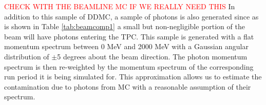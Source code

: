 \textcolor{red}{CHECK WITH THE BEAMLINE MC IF WE REALLY NEED THIS}
In addition to this sample of DDMC, a sample of photons is also generated since as is shown in Table \ref{tab:beamcomp1} a small but non-negligible portion of the beam will have photons entering the TPC. This sample is generated with a flat momentum spectrum between 0 MeV and 2000 MeV with a Gaussian angular distribution of $\pm$5 degrees about the beam direction. The photon momentum spectrum is then re-weighted by the momentum spectrum of the corresponding run period it is being simulated for. This approximation allows us to estimate the contamination due to photons from MC with a reasonable assumption of their spectrum.



